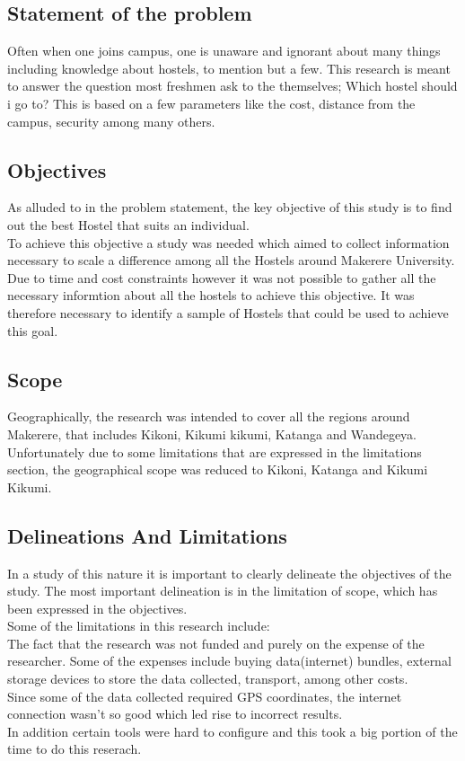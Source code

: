 \documentclass[12pt, a4paper]{article}
\begin{document}
\subsection{Statement of the problem}
Often when one joins campus, one is unaware and ignorant about many things including knowledge about hostels, to mention but a few. This research is meant to answer the question most freshmen ask to the themselves; Which hostel should i go to? This is based on a few parameters like the cost, distance from the campus, security among many others.

\subsection{Objectives}
As alluded to in the problem statement, the key objective of this study is to find out the best Hostel that suits an individual.\\
To achieve this objective a study was needed which aimed to collect information necessary to scale a difference among all the Hostels around Makerere University.\\
Due to time and cost constraints however it was not possible to gather all the necessary informtion about all the hostels to achieve this objective.  It was therefore necessary to identify a sample of Hostels that could be used to achieve this goal.

\subsection{Scope}
Geographically, the research was intended to cover all the regions around Makerere, that includes Kikoni, Kikumi kikumi, Katanga and Wandegeya. Unfortunately due to some limitations that are expressed in the limitations section, the geographical scope was reduced to Kikoni, Katanga and Kikumi Kikumi.

\subsection{Delineations And Limitations}
In a study of this nature it is important to clearly delineate the objectives of the study.  The most important delineation is in the limitation of scope, which has been expressed in the objectives.\\  
Some of the limitations in this research include:\\
The fact that the research was not funded and purely on the expense of the researcher. Some of the expenses include buying data(internet) bundles, external storage devices to store the data collected, transport, among other costs.\\
Since some of the data collected required GPS coordinates, the internet connection wasn't so good which led rise to incorrect results.\\
In addition certain tools were hard to configure and this took a big portion of the time to do this reserach.
\end{document}
